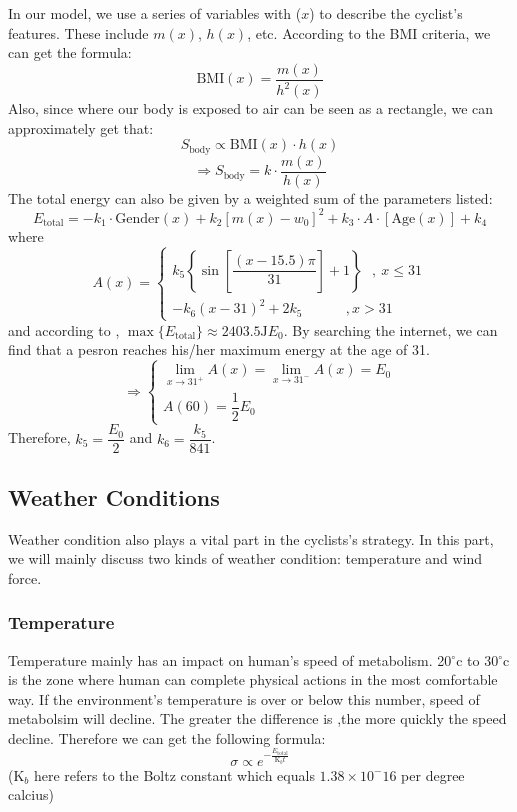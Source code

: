 \documentclass[12pt]{article}
\theoremstyle{definition}
\theoremstyle{remark}
\numberwithin{equation}{section}
\begin{document}
			In our model, we use a series of variables with (\(x\)) to describe the cyclist's features. These include $m( x )$, $ h ( x )$, etc. According to the BMI criteria, we can get the formula:
			$$\mathrm{BMI}( x )=\dfrac{m( x )}{ h ^2( x )}$$
			Also, since where our body is exposed to air can be seen as a rectangle, we can approximately get that:
			\[S_{\mathrm{body}} \propto \mathrm{BMI}(x)\cdot h(x)\]
			\[\Rightarrow S_{\mathrm{body}}=k\cdot \dfrac{m(x)}{h(x)}\]
			The total energy can also be given by a weighted sum of the parameters listed:
			\[E_{\mathrm{total}}=-k_1\cdot\mathrm{Gender}(x)+k_2[m(x)-w_0]^2+k_3\cdot A\cdot [\mathrm{Age}(x)]+k_4\]
			where
			\[A(x)=
				\begin{cases}
					k_5\left\{\sin\left[\dfrac{(x-15.5)\pi}{31 }\right]+1\right\}~~~,~x\leq 31 \\
					-k_6 (x-31)^2+2k_5~~~~~~~~~~~~~~,x>31
				\end{cases}
			\]
			and according to \cite{114514}, \(\max\{E_{\mathrm{total}}\}\approx 2403.5 \mathrm{J} E_{0}\). By searching the internet, we can find that a pesron reaches his/her maximum energy at the age of 31.
			\[
				\Rightarrow
				\begin{cases}
					\lim\limits_{x\rightarrow 31^+} A\left( x \right) =\lim\limits_{x\rightarrow 31^-} A\left( x \right)=E_0 \\
					A(60)=\dfrac 12 E_0
				\end{cases}
			\]
			Therefore, \(k_5 = \dfrac{E_0}{2}\) and \(k_6=\dfrac{k_5}{841}\).
	\subsection{Weather Conditions}
	Weather condition also plays a vital part in the cyclists's strategy. In this part, we will mainly discuss two kinds of weather condition: temperature and wind force.
	\subsubsection{Temperature}
	Temperature mainly has an impact on human's speed of metabolism. 20$^{\circ}\mathrm{c}$ to 30$^{\circ}\mathrm{c}$ is the zone where human can complete physical actions in the most comfortable way. If the environment's temperature is over or below this number, speed of metabolsim will decline. The greater the difference is ,the more quickly the speed decline. Therefore we can get the following formula:
	$$ \sigma\propto e^{-\frac{ E _\mathrm{total}}{\mathrm{K}_ b t}}$$
	($\mathrm{K}_ b $ here refers to the Boltz constant which equals $1.38\times10^-16$ per degree calcius)
\end{document}
